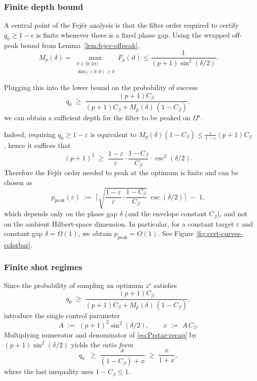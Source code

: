 \documentclass[a4paper,unpublished,onecolumn,11pt]{quantumarticle}
\theoremstyle{definition}
\theoremstyle{remark}
\begin{document}
\subsubsection{Finite depth bound}
A central point of the Fej\'er analysis is that the filter order required to certify \(q_0\ge 1-\epsilon\) is finite whenever there is a fixed phase gap. Using the wrapped off-peak bound from
Lemma~\ref{lem:fejer-offpeak},
\begin{equation}
M_p(\delta)
=
\max_{\substack{\vartheta\in[0,2\pi)\\
\operatorname{dist}_{\mathbb T}(\vartheta,0)\ge\delta}}
F_p(\vartheta)
\le
\frac{1}{(p+1)\sin^2(\delta/2)}.
\end{equation}

Plugging this into the lower bound on the probability of success
\[
q_0
\;\ge\;
\frac{(p+1)C_\beta}{(p+1)C_\beta + M_p(\delta)\,(1-C_\beta)},
\]
we can obtain a sufficient depth for the filter to be peaked on $\Omega^\star$.


Indeed, requiring $q_0\ge 1-\varepsilon$ is equivalent to
$M_p(\delta)(1-C_\beta)\le \frac{\varepsilon}{1-\varepsilon}(p+1)C_\beta$, hence it suffices that
\[
(p+1)^2
\;\ge\;
\frac{1-\varepsilon}{\varepsilon}\cdot \frac{1-C_\beta}{C_\beta}\cdot \csc^2(\delta/2).
\]
Therefore the Fej\'er order needed to peak at the optimum is finite and can be chosen as
\begin{equation}
\label{eq:depth}
p_{\mathrm{peak}}(\varepsilon)
\;:=\;
\Biggl\lceil
\sqrt{\frac{1-\varepsilon}{\varepsilon}\cdot \frac{1-C_\beta}{C_\beta}}\;\csc(\delta/2)
\Biggr\rceil \;-\; 1,
\end{equation}
which depends only on the phase gap $\delta$ (and the envelope constant $C_\beta$), and not on the ambient Hilbert-space dimension.
In particular, for a constant target $\varepsilon$ and constant gap $\delta=\Omega(1)$, we obtain $p_{\mathrm{peak}}=O(1)$. See Figure \ref{fig:cert-curves-colorbar}.




\subsubsection{Finite shot regimes}
Since the probability of sampling an optimum \(z^\star\) satisfies
\begin{equation}
\label{eq:Prstar-recap}
q_0
\;\ge\;
\frac{(p+1) C_\beta}{(p+1) C_\beta + M_p(\delta)\,(1-C_\beta)},
\end{equation}
introduce the single control parameter
\begin{equation}
\label{eq:def-x}
A\;:=\;(p{+}1)^2 \sin^2(\delta/2),
\qquad
x\;:=\;A\,C_\beta.
\end{equation}
Multiplying numerator and denominator of \eqref{eq:Prstar-recap} by \((p{+}1)\sin^2(\delta/2)\)
yields the \emph{ratio form}
\begin{equation}
\label{eq:q0-ratio}
q_0\;
\;\ge\;
\frac{x}{(1-C_\beta)+x}
\;\ge\;
\frac{x}{1+x},
\end{equation}
where the last inequality uses \(1-C_\beta\le 1\). 
\end{document}
